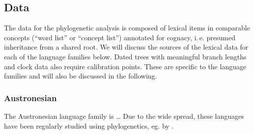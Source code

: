 \documentclass[a4paper,12pt]{scrartcl}
\begin{document}
\subsection{Data}
The data for the phylogenetic analysis is composed of lexical items in comparable concepts (“word list” or “concept list”) annotated
for cognacy, i.\,e. presumed inheritance from a shared root.
We will discuss the sources of the lexical data for each of the language families below.
Dated trees with meaningful branch lengths and clock data also require calibration points.
These are specific to the language families and will also be discussed in the following.

\subsubsection{Austronesian}

The Austronesian language family is …
Due to the wide spread, these languages have been regularly studied using phylogenetics, eg. by
\textcite{gray2009language,greenhill2017evolutionary,greenhill2018population}.
\end{document}

